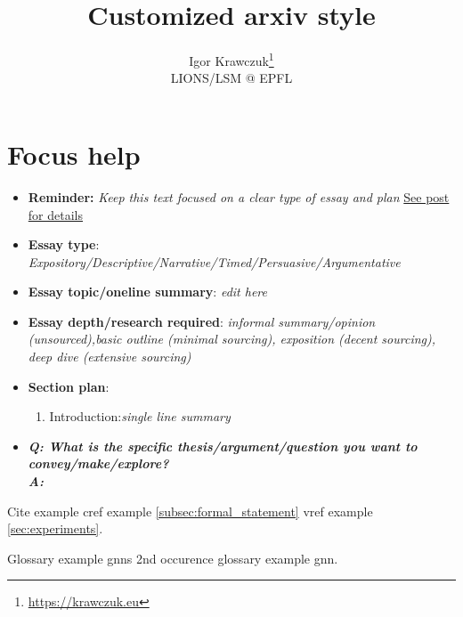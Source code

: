 \documentclass{article}
\title{Customized arxiv style}
\author{
    Igor Krawczuk\thanks{\url{https://krawczuk.eu}}\\
    LIONS/LSM @ EPFL
}
\begin{document}

\maketitle
\listoftodos

\begin{abstract}
\lipsum[1]
\end{abstract}



\section*{Focus help}
\begin{itemize}
  \item \textbf{Reminder:} \emph{Keep this text focused on a clear type of essay and plan} \href{https://brilliantio.com/how-to-focus-on-writing-an-essay/}{See post for details}
  \item \textbf{Essay type}: \emph{Expository/Descriptive/Narrative/Timed/Persuasive/Argumentative}
  \item \textbf{Essay topic/oneline summary}: \emph{edit here}
  \item \textbf{Essay depth/research required}: \emph{informal summary/opinion (unsourced),basic outline (minimal sourcing), exposition (decent sourcing), deep dive (extensive sourcing)}
  \item 	\textbf{Section plan}:
    \begin{enumerate}
      \item Introduction:\emph{single line summary}
    \end{enumerate}
  \item \textbf{\emph{Q: What is the specific thesis/argument/question you want to convey/make/explore?\\A:}}
\end{itemize}
Cite example \cite{kour2014real} cref example \cref{subsec:formal_statement} vref example \vref{sec:experiments}.

Glossary example \glspl{gnn} 2nd occurence glossary example \gls{gnn}.





\printbibliography
\printglossaries
\end{document}
